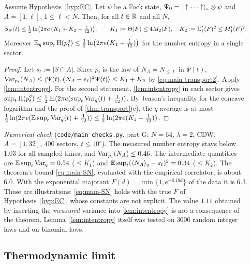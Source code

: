 \begin{theorem}\label{thm:numberentropy}
Assume Hypothesis~\ref{hyp:EC}.  Let $\psi$ be a Fock state, $\Psi_0=|\uparrow\cdots\uparrow\rangle_z\otimes\psi$ and
$A=[1,\ell]$, $1\le\ell<N$.  Then, for all $t\in\mathbb{R}$ and all $N$,
\begin{equation}\label{eq:main-SN}
  S_{N}(t)\le\tfrac12\ln\bigl(2\pi e\,(K_1+K_2+\tfrac1{12})\bigr),\qquad
  K_1:=\Theta(F)\le4M_2(F),\quad K_2:=\Sigma_1'(F)^2\le M'_1(F)^2 .
\end{equation}
Moreover $\mathbb{E}_q\sup_t\mathrm{H}(p^q_t)\le\frac12\ln\bigl(2\pi e(K_1+\frac1{12})\bigr)$ for the number entropy in a single sector.
\end{theorem}

\begin{proof}
Let $s_\ell:=|S\cap A|$.  Since $p_t$ is the law of $N_A=N_{\le\ell}$ in $\Psi(t)$,
$\operatorname{Var}_{p_t}(N_A)\le\langle\Psi(t),(N_A-s_\ell)^2\Psi(t)\rangle\le K_1+K_2$ by \eqref{eq:main-transport2}.  Apply
\cref{lem:intentropy}.  For the second statement, \cref{lem:intentropy} in each sector gives
$\sup_t\mathrm{H}(p^q_t)\le\frac12\ln(2\pi e(\sup_t\operatorname{Var}_q(t)+\frac1{12}))$.  By Jensen's inequality for the concave
logarithm and the proof of \cref{thm:transport}(c), the $q$-average is at most
$\frac12\ln(2\pi e(\mathbb{E}\sup_t\operatorname{Var}_q(t)+\frac1{12}))\le\frac12\ln(2\pi e(K_1+\frac1{12}))$.
\end{proof}

\begin{remark}\label{rem:main-numberentropy}
\emph{Numerical check} (\texttt{code/main\_checks.py}, part G; $N=64$, $\lambda=2$, CDW, $A=[1,32]$, $400$
sectors, $t\le10^5$).  The measured number entropy stays below $1.03$ for all sampled times, and
$\operatorname{Var}_{p_t}(N_A)\le0.46$.  The intermediate quantities are $\mathbb{E}\sup_t\operatorname{Var}_q=0.54$ ($\le K_1$) and
$\mathbb{E}\sup_t(\langle N_A\rangle_q-s_\ell)^2=0.34$ ($\le K_2$).  The theorem's bound \eqref{eq:main-SN}, evaluated with
the empirical correlator, is about $6.0$.  With the exponential majorant $F(d)=\min\{1,e^{-0.18d}\}$ of the
data it is $6.3$.  These are illustrations: \eqref{eq:main-SN} holds with the true $F$ of
Hypothesis~\ref{hyp:EC}, whose constants are not explicit.  The value $1.11$ obtained by inserting the
\emph{measured} variance into \cref{lem:intentropy} is not a consequence of the theorem.  Lemma~\ref{lem:intentropy}
itself was tested on $3000$ random integer laws and on binomial laws.
\end{remark}

\subsection{Thermodynamic limit}\label{sec:main:infvol}

